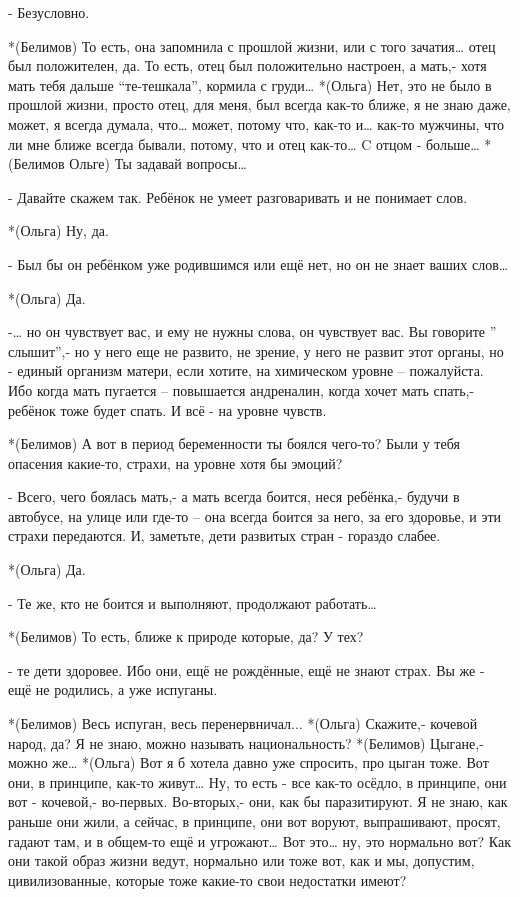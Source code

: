 - Безусловно.

*(Белимов) То есть, она запомнила с прошлой жизни, или с того зачатия… отец был положителен, да. То есть, отец был положительно настроен, а мать,- хотя мать тебя дальше “те-тешкала”, кормила с груди…
*(Ольга) Нет, это не было в прошлой жизни, просто отец, для меня, был всегда как-то ближе, я не знаю даже, может, я всегда думала, что… может, потому что, как-то и… как-то мужчины, что ли мне ближе всегда бывали, потому, что и отец как-то… C отцом - больше…
*(Белимов Ольге) Ты задавай вопросы…

- Давайте скажем так. Ребёнок не умеет разговаривать и не понимает слов. 

*(Ольга) Ну, да.

- Был бы он ребёнком уже родившимся или ещё нет, но он не знает ваших слов…

*(Ольга) Да.

-… но он чувствует вас, и ему не нужны слова, он чувствует вас. Вы говорите ” слышит”,- но у него еще не развито, не зрение, у него не развит этот органы, но - единый организм матери, если хотите, на химическом уровне – пожалуйста. Ибо когда мать пугается – повышается андреналин, когда хочет мать спать,- ребёнок тоже будет спать. И всё - на уровне чувств.

*(Белимов) А вот в период беременности ты боялся чего-то? Были у тебя опасения какие-то, страхи, на уровне хотя бы эмоций?

- Всего, чего боялась мать,- а мать всегда боится, неся ребёнка,- будучи в автобусе, на улице или где-то – она всегда боится за него, за его здоровье, и эти страхи передаются. И, заметьте, дети развитых стран - гораздо слабее.

*(Ольга) Да.

- Те же, кто не боится и выполняют, продолжают работать…

*(Белимов) То есть, ближе к природе которые, да? У тех?

- те дети здоровее. Ибо они, ещё не рождённые, ещё не знают страх. Вы же - ещё не родились, а уже испуганы.

*(Белимов) Весь испуган, весь перенервничал...
*(Ольга) Скажите,- кочевой народ, да? Я не знаю, можно называть национальность?
*(Белимов) Цыгане,-  можно же…
*(Ольга) Вот я б хотела давно уже спросить, про цыган тоже. Вот они, в принципе, как-то живут… Ну, то есть - все как-то осёдло, в принципе, они вот - кочевой,- во-первых. Во-вторых,- они, как бы паразитируют. Я не знаю, как раньше они жили, а сейчас, в принципе, они вот воруют, выпрашивают, просят, гадают там, и в общем-то ещё и угрожают… Вот это… ну, это нормально вот? Как они такой образ жизни ведут, нормально или тоже вот, как и мы, допустим, цивилизованные, которые тоже какие-то свои недостатки имеют?

